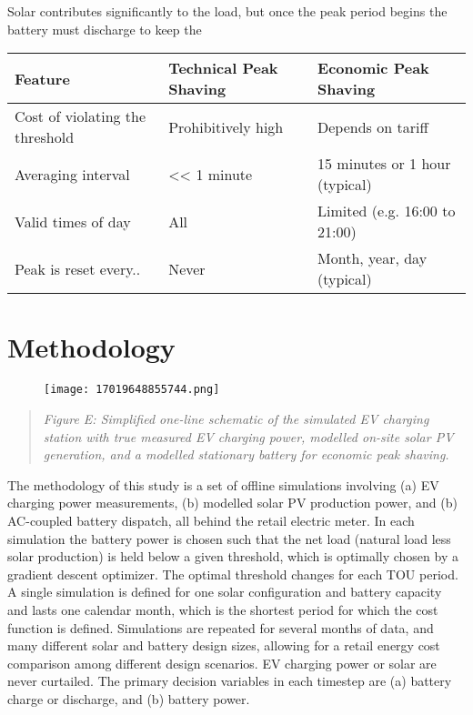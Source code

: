 \documentclass[
]{article}
\begin{document}
Solar contributes significantly to the load, but once the peak period
begins the battery must discharge to keep the

\begin{longtable}[]{@{}lll@{}}
\toprule
Feature & Technical Peak Shaving & Economic Peak Shaving\tabularnewline
\midrule
\endhead
Cost of violating the threshold & Prohibitively high & Depends on
tariff\tabularnewline
Averaging interval & \textless\textless{} 1 minute & 15 minutes or 1
hour (typical)\tabularnewline
Valid times of day & All & Limited (e.g. 16:00 to 21:00)\tabularnewline
Peak is reset every.. & Never & Month, year, day
(typical)\tabularnewline
\bottomrule
\end{longtable}

\hypertarget{methodology}{%
\section{Methodology}\label{methodology}}

\begin{figure}
\centering
\texttt{[image: 17019648855744.png]}
\caption{}
\end{figure}

\begin{quote}
\emph{Figure E: Simplified one-line schematic of the simulated EV
charging station with true measured EV charging power, modelled on-site
solar PV generation, and a modelled stationary battery for economic peak
shaving.}
\end{quote}

The methodology of this study is a set of offline simulations involving
(a) EV charging power measurements, (b) modelled solar PV production
power, and (b) AC-coupled battery dispatch, all behind the retail
electric meter. In each simulation the battery power is chosen such that
the net load (natural load less solar production) is held below a given
threshold, which is optimally chosen by a gradient descent optimizer.
The optimal threshold changes for each TOU period. A single simulation
is defined for one solar configuration and battery capacity and lasts
one calendar month, which is the shortest period for which the cost
function is defined. Simulations are repeated for several months of
data, and many different solar and battery design sizes, allowing for a
retail energy cost comparison among different design scenarios. EV
charging power or solar are never curtailed. The primary decision
variables in each timestep are (a) battery charge or discharge, and (b)
battery power.
\end{document}
